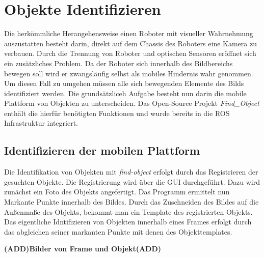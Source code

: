 \section{Objekte Identifizieren}
Die herkömmliche Herangehensweise einen Roboter mit visueller Wahrnehmung auszustatten besteht darin, direkt auf dem Chassis des Roboters eine Kamera zu verbauen. Durch die Trennung von Roboter und optischen Sensoren eröffnet sich ein zusätzliches Problem. Da der Roboter sich innerhalb des Bildbereichs bewegen soll wird er zwangsläufig selbst als mobiles Hindernis wahr genommen. Um diesen Fall zu umgehen müssen alle sich bewegenden Elemente des Bilds identifiziert werden. Die grundsätzliceh Aufgabe besteht nun darin die mobile Plattform von Objekten zu unterscheiden. Das Open-Source Projekt \textit{Find\_Object} enthält die hierfür benötigten Funktionen und wurde bereits in die ROS Infrastruktur integriert.

	\subsection{Identifizieren der mobilen Plattform}
	Die Identifikation von Objekten mit \textit{find-object} erfolgt durch das Registrieren der gesuchten Objekte. Die Registrierung wird über die GUI durchgeführt. Dazu wird zunächst ein Foto des Objekts angefertigt. Das Programm ermittelt nun Markante Punkte innerhalb des Bildes. Durch das Zuschneiden des Bildes auf die Außenmaße des Objekts, bekommt man ein Template des registrierten Objekts. Das eigentliche Idntifizieren von Objekten innerhalb eines Frames erfolgt durch das abgleichen seiner markanten Punkte mit denen des Objekttemplates.\newline
	
	\textbf{(ADD)Bilder von Frame und Objekt(ADD)}\newline
	
